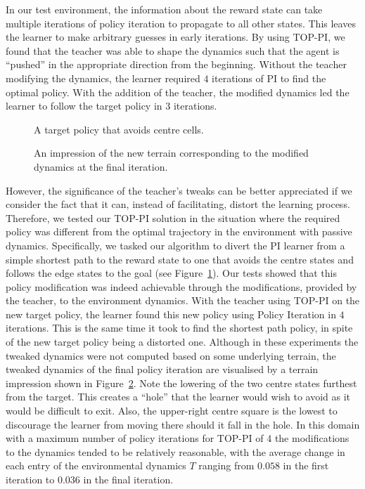 In our test environment, the information about the reward state can
take multiple iterations of policy iteration to propagate to all other
states.  This leaves the learner to make arbitrary guesses in early
iterations.  By using TOP-PI, we found that the teacher was able to
shape the dynamics such that the agent is ``pushed'' in the
appropriate direction from the beginning.  Without the teacher
modifying the dynamics, the learner required $4$ iterations of PI to
find the optimal policy.  With the addition of the teacher, the
modified dynamics led the learner to follow the target policy in $3$
iterations.

\begin{figure}[ht]
\centerline{}
\caption{\label{newopt}A target policy that avoids centre cells.}
\end{figure}

\begin{figure}[ht]
\centerline{}
\caption{\label{newalt}An impression of the new terrain corresponding to the modified dynamics at the final iteration.}
\end{figure}

However, the significance of the teacher's tweaks can be better
appreciated if we consider the fact that it can, instead of
facilitating, distort the learning process. Therefore, we tested our
TOP-PI solution in the situation where the required policy was
different from the optimal trajectory in the environment with passive
dynamics. Specifically, we tasked our algorithm to divert the PI
learner from a simple shortest path to the reward state to one that
avoids the centre states and follows the edge states to the goal (see
Figure~\ref{newopt}).  Our tests showed that this policy modification
was indeed achievable through the modifications, provided by the
teacher, to the environment dynamics.  With the teacher using TOP-PI
on the new target policy, the learner found this new policy using
Policy Iteration in $4$ iterations. This is the same time it took to
find the shortest path policy, in spite of the new target policy being
a distorted one.  Although in these experiments the tweaked dynamics
were not computed based on some underlying terrain, the tweaked
dynamics of the final policy iteration are visualised by a terrain
impression shown in Figure~\ref{newalt}.  Note the lowering of the two
centre states furthest from the target.  This creates a ``hole'' that
the learner would wish to avoid as it would be difficult to exit.  
Also, the upper-right centre square is the lowest to discourage the 
learner from moving there should it fall in the hole. In this domain 
with a maximum number of policy iterations for TOP-PI of $4$ the
modifications to the dynamics tended to be relatively reasonable, with the
average change in each entry of the environmental dynamics $T$ ranging
from $0.058$ in the first iteration to $0.036$ in the final iteration.

